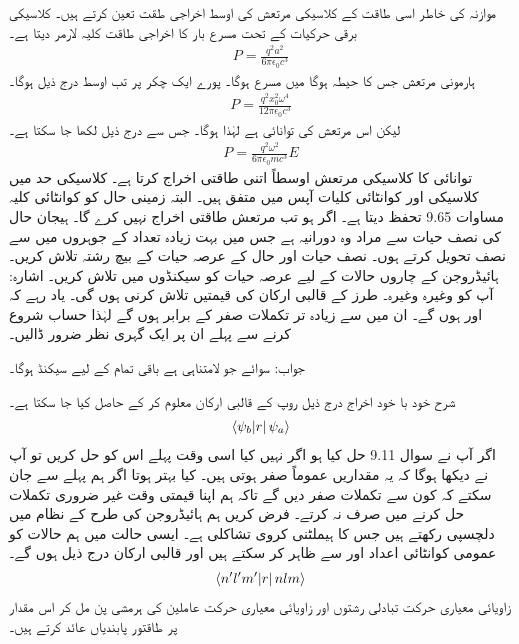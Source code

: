 موازنہ کی خاطر اسی طاقت کے کلاسیکی مرتعش کی اوسط اخراجی طقت تعین کرتے ہیں۔ کلاسیکی برقی حرکیات کے تحت مسرع بار  کا اخراجی طاقت کلیہ لارمر دیتا ہے۔
\begin{align}
	P = \frac{q^2a^2}{6\pi\epsilon_0c^3}
\end{align}
ہارمونی مرتعش  جس کا حیطہ  ہوگا میں مسرع  ہوگا۔ پورے ایک چکر پر تب اوسط درج ذیل ہوگا۔
\begin{align*}
	P = \frac{q^2x^2_0\omega^4}{12\pi\epsilon_0c^3}
\end{align*}
لیکن اس مرتعش کی توانائی  ہے لہٰذا  ہوگا۔ جس سے درج ذیل لکھا جا سکتا ہے۔
\begin{align}
	P = \frac{q^2\omega^2}{6\pi\epsilon_0mc^3}E
\end{align}
توانائی  کا کلاسیکی مرتعش اوسطاً اتنی طاقتی اخراج کرتا ہے۔ کلاسیکی حد  میں کلاسیکی اور کوانٹائی کلیات آپس میں متفق ہیں۔ البتہ زمینی حال کو کوانٹائی کلیہ مساوات \num{9.65}  تحفظ  دیتا ہے۔ اگر  ہو تب مرتعش طاقتی اخراج نہیں کرے گا۔
ہیجان حال کی نصف حیات سے مراد وہ دورانیہ ہے جس میں بہت زیادہ تعداد کے جوہروں میں سے نصف تحویل کرتے ہوں۔ نصف حیات اور حال کے عرصہ حیات کے بیچ رشتہ تلاش کریں۔
ہائیڈروجن کے چاروں  حالات کے لیے عرصہ حیات کو سیکنڈوں میں تلاش کریں۔ اشارہ: آپ کو  وغیرہ وغیرہ۔ طرز کے قالبی ارکان کی قیمتیں تلاش کرنی ہوں گی۔ یاد رہے کہ  اور  ہوں گے۔ ان میں سے زیادہ تر تکملات صفر کے برابر ہوں گے لہٰذا حساب شروع کرنے سے پہلے ان پر ایک گہری نظر ضرور ڈالیں۔

جواب: سوائے  جو لامتناہی ہے باقی تمام کے لیے  سیکنڈ  ہوگا۔


شرح خود با خود اخراج درج ذیل روپ کے قالبی ارکان معلوم کر کے حاصل کیا جا سکتا ہے۔
\begin{align*}
	\langle \psi_b\abs{r}\psi_a \rangle
\end{align*}
اگر آپ نے سوال \num{9.11} حل کیا ہو اگر نہیں کیا اسی وقت پہلے اس کو حل کریں تو آپ نے دیکھا ہوگا کہ یہ مقداریں عموماً صفر ہوتی ہیں۔ کیا بہتر ہوتا اگر ہم پہلے سے جان سکتے کہ کون سے تکملات صفر دیں گے تاکہ ہم اپنا قیمتی وقت غیر ضروری تکملات حل کرنے میں صرف نہ کرتے۔ فرض کریں ہم ہائیڈروجن کی طرح کے نظام میں دلچسپی رکھتے ہیں جس کا ہیملٹنی کروی تشاکلی ہے۔ ایسی حالت میں ہم حالات کو عمومی کوانٹائی اعداد  اور  سے ظاہر کر سکتے ہیں اور قالبی ارکان درج ذیل ہوں گے۔  
\begin{align*}
	\langle n^\prime l^\prime m^\prime\abs{r}nlm \rangle
\end{align*}
زاویائی معیاری حرکت تبادلی رشتوں اور زاویائی معیاری حرکت عاملین کی ہرمشی پن مل کر اس مقدار پر طاقتور پابندیاں عائد کرتے ہیں۔

